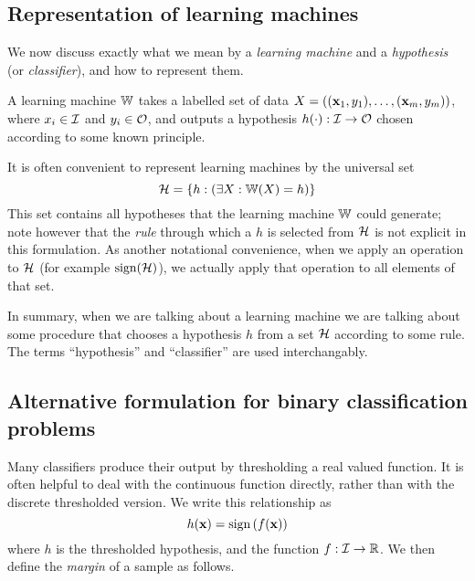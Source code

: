 \subsection{Representation of learning machines}
\label{sec:representation learning machines}

We now discuss exactly what we mean by a \emph{learning machine} and a
\emph{hypothesis} (or \emph{classifier}), and how to represent them.

A learning machine $\mathbb{W}$ takes a labelled set of data $X =
((\mathbf{x}_1, y_1), \ldots, (\mathbf{x}_m, y_m))$, where $x_i \in \mathcal{I}$ and
$y_i \in \mathcal{O}$, and outputs a hypothesis $h(\cdot) : \mathcal{I} \rightarrow
\mathcal{O}$ chosen according to some known principle.

It is often convenient to represent learning machines by the universal
set
%
\begin{equation}
\mathcal{H} = \{h : \left( \exists X : \mathbb{W}(X) = h \right) \}
\end{equation}
%
This set
contains all hypotheses that the learning machine $\mathbb{W}$ could
generate; note however that the \emph{rule} through which a $h$ is
selected from $\mathcal{H}$ is not explicit in this formulation. 
As another notational convenience, when we apply an operation to $\mathcal{H}$
(for example $\mathrm{sign}(\mathcal{H})$), we actually apply that operation to all
elements of that set.

In summary, when we are talking about a learning machine we are
talking about some procedure that chooses a hypothesis $h$ from a set
$\mathcal{H}$ according to some rule.  The terms ``hypothesis'' and
``classifier'' are used interchangably.


\subsection{Alternative formulation for binary classification problems}
\label{sec:margin formulation}

Many classifiers produce their output by thresholding a real valued
function.  It is often helpful to deal with the continuous function
directly, rather than with the discrete thresholded version.  We write
this relationship as 
%
\begin{equation}
h(\mathbf{x}) = \mathrm{sign} \left( f(\mathbf{x}) \right)
\label{eqn:marginal classification formulation}
\end{equation}
%
where $h$ is the thresholded hypothesis, and the function $f : \mathcal{I}
\rightarrow \mathbb{R}$.  We then define the \emph{margin} of a sample
as follows. 

